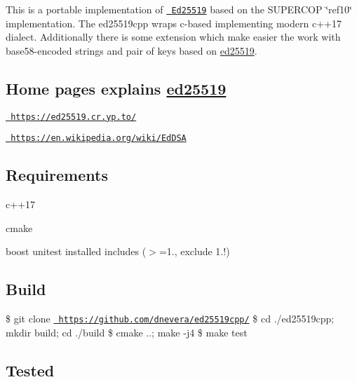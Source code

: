 This is a portable implementation of \href{http://ed25519.cr.yp.to/}{\texttt{ Ed25519}} based on the S\+U\+P\+E\+R\+C\+OP \char`\"{}ref10\char`\"{} implementation. The ed25519cpp wraps c-\/based implementing modern c++17 dialect. Additionally there is some extension which make easier the work with base58-\/encoded strings and pair of keys based on \mbox{\hyperlink{namespaceed25519}{ed25519}}.

\subsection*{Home pages explains \mbox{\hyperlink{namespaceed25519}{ed25519}}}


\begin{DoxyEnumerate}
\item \href{https://ed25519.cr.yp.to/}{\texttt{ https\+://ed25519.\+cr.\+yp.\+to/}}
\end{DoxyEnumerate}
\begin{DoxyEnumerate}
\item \href{https://en.wikipedia.org/wiki/EdDSA}{\texttt{ https\+://en.\+wikipedia.\+org/wiki/\+Ed\+D\+SA}}
\end{DoxyEnumerate}

\subsection*{Requirements}


\begin{DoxyEnumerate}
\item c++17
\end{DoxyEnumerate}
\begin{DoxyEnumerate}
\item cmake
\end{DoxyEnumerate}
\begin{DoxyEnumerate}
\item boost unitest installed includes ($>$=1., exclude 1.!)
\end{DoxyEnumerate}

\subsection*{Build}

\$ git clone \href{https://github.com/dnevera/ed25519cpp/}{\texttt{ https\+://github.\+com/dnevera/ed25519cpp/}} \$ cd ./ed25519cpp; mkdir build; cd ./build \$ cmake ..; make -\/j4 \$ make test

\subsection*{Tested}


